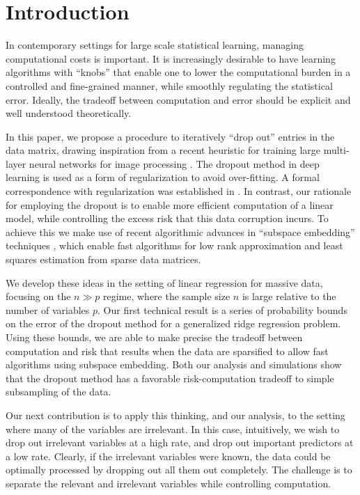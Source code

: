 \section{Introduction}



In contemporary settings for large scale statistical learning,
managing computational costs is important.
It is increasingly desirable to have learning
algorithms with ``knobs'' that enable one to lower the computational
burden in a controlled and fine-grained manner, while smoothly
regulating the statistical error.  Ideally, the tradeoff between
computation and error should be explicit and well understood theoretically.

In this paper, we propose a procedure to iteratively ``drop out''
entries in the data matrix, drawing inspiration from a recent
heuristic for training large multi-layer neural networks for image
processing \cite{Hinton:2012}.  The dropout method in deep learning is
used as a form of regularization to avoid over-fitting.  A formal
correspondence with regularization was established in \cite{Wager:2013}.
In contrast, our rationale for employing the dropout is to enable more
efficient computation of a linear model, while controlling the excess
risk that this data corruption incurs.  To achieve this we make use of recent algorithmic advances in
``subspace embedding'' techniques \cite{Clarkson:2012,Nelson:2012},
which enable fast algorithms for low rank approximation and least
squares estimation from sparse data matrices.

We develop these ideas in the setting of linear regression for massive
data, focusing on the $n\gg p$ regime, where the sample size $n$ is
large relative to the number of variables $p$.  Our first technical
result is a series of probability bounds on the error of the dropout
method for a generalized ridge regression problem.  Using these
bounds, we are able to make precise the tradeoff between computation
and risk that results when the data are sparsified to allow fast
algorithms using subspace embedding.  Both our analysis and
simulations show that the dropout method has a favorable
risk-computation tradeoff to simple subsampling of the data.

Our next contribution is to apply this thinking, and our analysis, to
the setting where many of the variables are irrelevant.  
In this case, intuitively, we wish to drop out irrelevant variables at a high rate, and drop
out important predictors at a low rate.  Clearly, if the 
irrelevant variables were known, the data could be optimally processed by
dropping out all them out completely.  The challenge is to
separate the relevant and irrelevant variables while controlling
computation.

